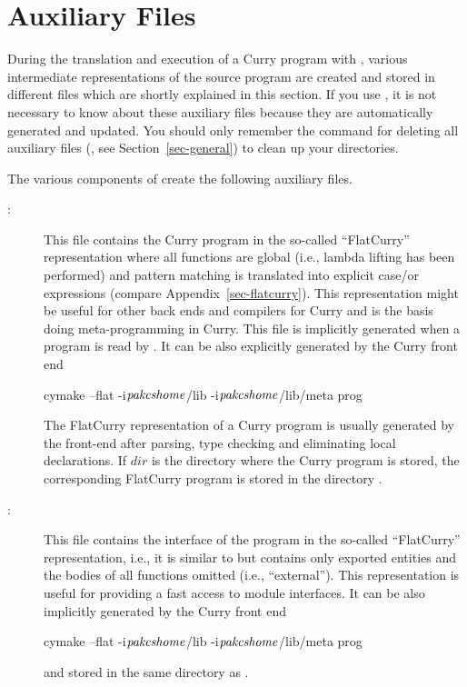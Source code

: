 \section{Auxiliary Files}
\label{sec-auxfiles}

During the translation and execution of a Curry program with \CYS,
various intermediate representations of the source program are created
and stored in different files which are shortly explained in this section.
If you use \CYS, it is not necessary to know about
these auxiliary files because they are automatically generated
and updated. You should only remember the command for deleting
all auxiliary files (, see Section~\ref{sec-general})
to clean up your directories.

The various components of \CYS create
the following auxiliary files.
\begin{description}
\item[:] This file contains the Curry program
in the so-called ``FlatCurry'' representation where all functions are global
(i.e., lambda lifting has been performed) and pattern matching
is translated into explicit case/or expressions
(compare Appendix~\ref{sec-flatcurry}).
This representation might be useful for other back ends and
compilers for Curry and is the basis doing meta-programming in Curry.
This file is implicitly
generated when a program is read by \CYS.
It can be also explicitly generated by the Curry front end
\begin{curry}
cymake --flat -i$\mbox{\textit{pakcshome}}$/lib -i$\mbox{\textit{pakcshome}}$/lib/meta prog
\end{curry}
The FlatCurry representation of a Curry program is usually
generated by the front-end after parsing, type checking and eliminating
local declarations.
If $dir$ is the directory where the Curry program is stored,
the corresponding FlatCurry program is stored in the directory
.

\item[:] This file contains the interface
of the program in the so-called ``FlatCurry'' representation,
i.e., it is similar to  but contains only exported
entities and the bodies of all functions omitted (i.e., ``external'').
This representation is useful for providing a fast access
to module interfaces.
It can be also implicitly generated by the Curry front end
\begin{curry}
cymake --flat -i$\mbox{\textit{pakcshome}}$/lib -i$\mbox{\textit{pakcshome}}$/lib/meta prog
\end{curry}
and stored in the same directory as .


\end{description}
